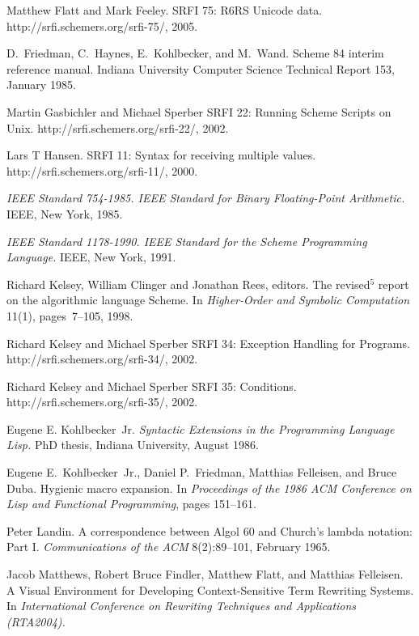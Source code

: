 \begin{thebibliography}{999}
Matthew Flatt and Mark Feeley.
SRFI 75: R6RS Unicode data.
{\cf http://srfi.schemers.org/\linebreak[1]srfi-75/}, 2005.

D.~Friedman, C.~Haynes, E.~Kohlbecker, and M.~Wand.
Scheme 84 interim reference manual.
Indiana University Computer Science Technical Report 153, January 1985.

Martin Gasbichler and Michael Sperber
SRFI 22: Running Scheme Scripts on Unix.
{\cf http://srfi.schemers.org/srfi-22/}, 2002.

Lars T Hansen.
SRFI 11: Syntax for receiving multiple values.
{\cf http://srfi.schemers.org/srfi-11/}, 2000.

{\em IEEE Standard 754-1985.  IEEE Standard for Binary Floating-Point
Arithmetic.}  IEEE, New York, 1985.

{\em IEEE Standard 1178-1990.  IEEE Standard for the Scheme
  Programming Language.}  IEEE, New York, 1991.

Richard Kelsey, William Clinger and Jonathan Rees, editors.
The revised$^5$ report on the algorithmic language Scheme.
In {\em Higher-Order and Symbolic Computation} 11(1), pages~7--105, 1998.

Richard Kelsey and Michael Sperber
SRFI 34: Exception Handling for Programs.
{\cf http://srfi.\linebreak[1]schemers.\linebreak[1]org/\linebreak[1]srfi-34/}, 2002.

Richard Kelsey and Michael Sperber
SRFI 35: Conditions.
{\cf http://srfi.schemers.org/srfi-35/}, 2002.

Eugene E. Kohlbecker~Jr.
{\em Syntactic Extensions in the Programming Language Lisp.}
PhD thesis, Indiana University, August 1986.

Eugene E.~Kohlbecker~Jr., Daniel P.~Friedman, Matthias Felleisen, and Bruce Duba.
Hygienic macro expansion.
In {\em Proceedings of the 1986 ACM Conference on Lisp
  and Functional Programming}, pages 151--161.

Peter Landin.
A correspondence between Algol 60 and Church's lambda notation: Part I.
{\em Communications of the ACM} 8(2):89--101, February 1965.

Jacob Matthews, Robert Bruce Findler, Matthew
  Flatt, and Matthias Felleisen.
A Visual Environment for Developing Context-Sensitive Term Rewriting Systems.
In {\em International Conference on Rewriting Techniques and Applications (RTA2004).}


\end{thebibliography}
